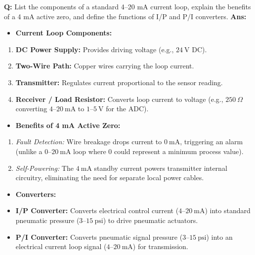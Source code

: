 \documentclass[10pt,a4paper,twocolumn]{article}
\begin{document}
\begin{tcolorbox}[
  colback=white,
  colframe=UnitColorOne,
  colbacktitle=gray!10!white,
  coltitle=black,
  fonttitle=\bfseries\sffamily\small,
  title={Unit I $\bullet$ Card 17: Process Loop Standards \& Converters (Q1.9)},
  boxrule=1.2pt,
  arc=2mm,
  outer arc=2mm,
  boxsep=1.5mm,
  top=1mm,
  bottom=1mm,
  left=1.5mm,
  right=1.5mm,
  before skip=2.5mm,
  after skip=2.5mm
]
\textbf{Q:} List the components of a standard 4–20 mA current loop, explain the benefits of a 4 mA active zero, and define the functions of I/P and P/I converters.
\tcbline
\textbf{Ans:} \begin{itemize}
  \item   \textbf{Current Loop Components:}
\end{itemize}
\begin{enumerate}
  \item \textbf{DC Power Supply:} Provides driving voltage (e.g., $24\ \text{V DC}$).
  \item \textbf{Two-Wire Path:} Copper wires carrying the loop current.
  \item \textbf{Transmitter:} Regulates current proportional to the sensor reading.
  \item \textbf{Receiver / Load Resistor:} Converts loop current to voltage (e.g., $250\ \Omega$ converting $4\text{--}20\ \text{mA}$ to $1\text{--}5\ \text{V}$ for the ADC).
\end{enumerate}
\begin{itemize}
  \item   \textbf{Benefits of 4 mA Active Zero:}
\end{itemize}
\begin{enumerate}
  \item \textit{Fault Detection:} Wire breakage drops current to $0\ \text{mA}$, triggering an alarm (unlike a $0\text{--}20\ \text{mA}$ loop where $0$ could represent a minimum process value).
  \item \textit{Self-Powering:} The $4\ \text{mA}$ standby current powers transmitter internal circuitry, eliminating the need for separate local power cables.
\end{enumerate}
\begin{itemize}
  \item   \textbf{Converters:}
  \item   \textbf{I/P Converter:} Converts electrical control current ($4\text{--}20\ \text{mA}$) into standard pneumatic pressure ($3\text{--}15\ \text{psi}$) to drive pneumatic actuators.
  \item   \textbf{P/I Converter:} Converts pneumatic signal pressure ($3\text{--}15\ \text{psi}$) into an electrical current loop signal ($4\text{--}20\ \text{mA}$) for transmission.
\end{itemize}
\end{tcolorbox}
\end{document}
